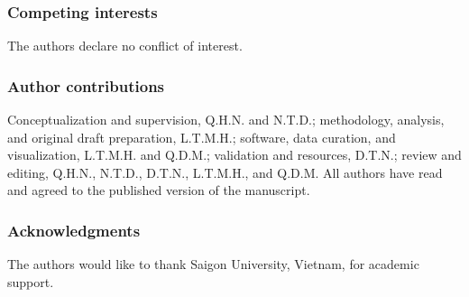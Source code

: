 \documentclass[runningheads]{llncs}
\begin{document}
\begin{credits}\subsubsection{Competing interests}

The authors declare no conflict of interest.

\subsubsection{Author contributions}

Conceptualization and supervision, Q.H.N. and N.T.D.; methodology, analysis, and original draft preparation, L.T.M.H.; software, data curation, and visualization, L.T.M.H. and Q.D.M.; validation and resources, D.T.N.; review and editing, Q.H.N., N.T.D., D.T.N., L.T.M.H., and Q.D.M. All authors have read and agreed to the published version of the manuscript.

\subsubsection{Acknowledgments}

The authors would like to thank Saigon University, Vietnam, for academic support.

\end{credits}
\end{document}

